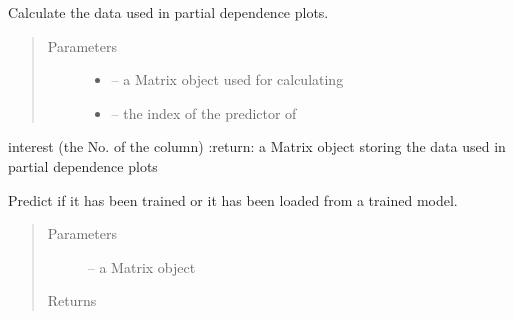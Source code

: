 \documentclass[letterpaper,10pt,english]{sphinxmanual}
\begin{document}
\begin{fulllineitems}
\begin{fulllineitems}
\begin{quote}
\begin{description}
\end{description}\end{quote}

\end{fulllineitems}


\begin{fulllineitems}
\label{\detokenize{index:dbm_py.interface.DBM.pdp}}
Calculate the data used in partial dependence plots.
\begin{quote}\begin{description}
\item[{Parameters}] \leavevmode\begin{itemize}
\item {} 
 -- a Matrix object used for calculating

\item {} 
 -- the index of the predictor of

\end{itemize}

\end{description}\end{quote}

interest (the No. of the column)
:return: a Matrix object storing the data used in partial
dependence plots

\end{fulllineitems}


\begin{fulllineitems}
\label{\detokenize{index:dbm_py.interface.DBM.predict}}
Predict if it has been trained or it has been loaded from
a trained model.
\begin{quote}\begin{description}
\item[{Parameters}] \leavevmode
{} -- a Matrix object

\item[{Returns}] \leavevmode


\end{description}\end{quote}

\end{fulllineitems}


\end{fulllineitems}
\end{document}
